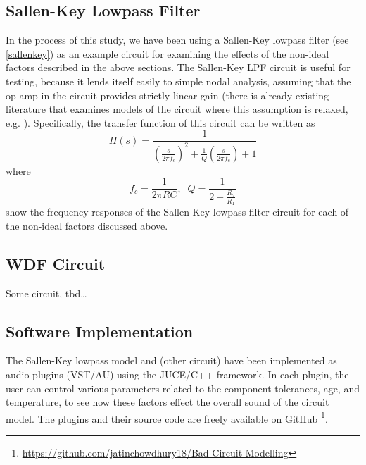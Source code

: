 \documentclass[twoside,a4paper]{article}
\begin{document}
\subsection{Sallen-Key Lowpass Filter} \label{sec:SK-LPF}
%
In the process of this study, we have been using a Sallen-Key lowpass
filter \cite{SallenKey} (see \cref{sallenkey}) as an example circuit for
examining the effects of the non-ideal factors described in the above
sections. The Sallen-Key LPF circuit is useful for testing, because it
lends itself easily to simple nodal analysis, assuming that the op-amp
in the circuit provides strictly linear gain (there is already existing
literature that examines models of the circuit where this assumption is
relaxed, e.g. \cite{SKF-DAFX}). Specifically, the transfer function of
this circuit can be written as
%
\begin{equation}
    H(s) = \frac{1}{\left(\frac{s}{2\pi f_c} \right)^2
         + \frac{1}{Q}\left(\frac{s}{2\pi f_c} \right) + 1}  
    \label{eq:SKF-transfer}
\end{equation}
%
where
%
\begin{equation}
    f_c = \frac{1}{2\pi RC}, \;\;
    Q = \frac{1}{2 - \frac{R_2}{R_1}}
    \label{eq:SKF-params}
\end{equation}
%
 show the
frequency responses of the Sallen-Key lowpass filter circuit for
each of the non-ideal factors discussed above.

\subsection{WDF Circuit} \label{sec:WDF}
%
Some circuit, tbd\dots

\subsection{Software Implementation} \label{sec:soft-impl}
%
The Sallen-Key lowpass model and (other circuit) have been implemented
as audio plugins (VST/AU) using the JUCE/C++ framework. In each plugin,
the user can control various parameters related to the component
tolerances, age, and temperature, to see how these factors effect the
overall sound of the circuit model. The plugins and their source code are
freely available on GitHub
\footnote{\url{https://github.com/jatinchowdhury18/Bad-Circuit-Modelling}}.
\end{document}
